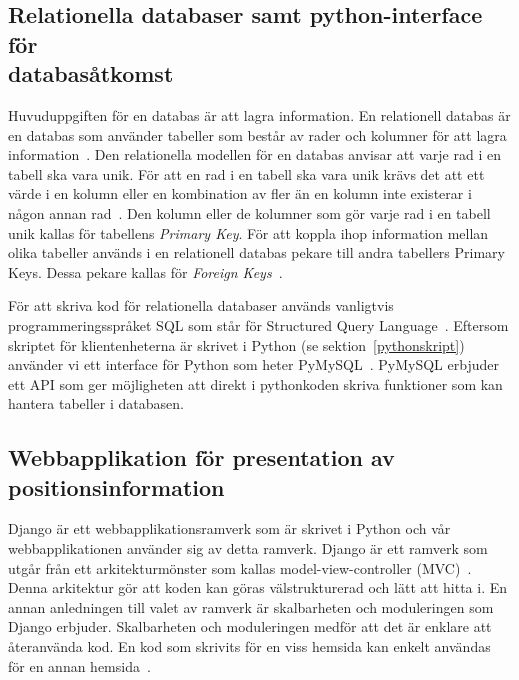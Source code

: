 \documentclass[a4paper,12pt]{article}
\begin{document}
\subsection{Relationella databaser samt python-interface för \\databasåtkomst} \label{relationella_databaser}
Huvuduppgiften för en databas är att lagra information. En relationell databas är en databas som använder tabeller som består av rader och kolumner för att lagra information~\cite{database_fundamentals}. Den relationella modellen för en databas anvisar att varje rad i en tabell ska vara unik. För att en rad i en tabell ska vara unik krävs det att ett värde i en kolumn eller en kombination av fler än en kolumn inte existerar i någon annan rad~\cite{database_fundamentals}. Den kolumn eller de kolumner som gör varje rad i en tabell unik kallas för tabellens \textit{Primary Key}.
För att koppla ihop information mellan olika tabeller används i en relationell databas pekare till andra tabellers Primary Keys. Dessa pekare kallas för \textit{Foreign Keys}~\cite{database_fundamentals}.

För att skriva kod för relationella databaser används vanligtvis programmeringsspråket SQL som står för Structured Query Language~\cite{sql}.
Eftersom skriptet för klientenheterna är skrivet i Python (se sektion~\ref{pythonskript}) använder vi ett interface för Python som heter PyMySQL~\cite{pymysql}. PyMySQL erbjuder ett API som ger möjligheten att direkt i pythonkoden skriva funktioner som kan hantera tabeller i databasen.


 \subsection{Webbapplikation för presentation av positionsinformation}\label{django}
 Django är ett webbapplikationsramverk som är skrivet i Python och vår webbapplikationen använder sig av detta ramverk. Django är ett ramverk som utgår från ett arkitekturmönster som kallas model-view-controller (MVC)~\cite{djangoMVC}. Denna arkitektur gör att koden kan göras välstrukturerad och lätt att hitta i. En annan anledningen till valet av ramverk är skalbarheten och moduleringen som Django erbjuder. Skalbarheten och moduleringen medför att det är enklare att återanvända kod. En kod som skrivits för en viss hemsida kan enkelt användas för en annan hemsida~\cite{djangoMVC}.
\end{document}
